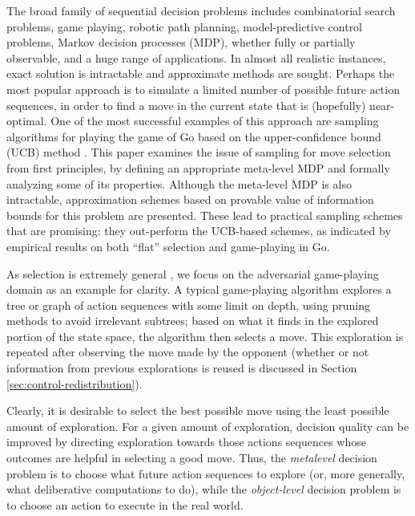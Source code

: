 The broad family of sequential decision problems includes
combinatorial search problems, game playing, robotic path planning,
model-predictive control problems, Markov decision processes (MDP), whether fully or
partially observable, and a huge range of applications. In almost all
realistic instances, exact solution is intractable and approximate
methods are sought. Perhaps the most popular approach is to simulate
a limited number of possible future action sequences, 
in order to find a move in the current state that is (hopefully)
near-optimal. One of the most successful
examples of this approach are sampling algorithms for
playing the game of Go \citep{Gelly.mogo} based on the upper-confidence bound (UCB)
method \citep{Kocsis+Szepesvari:2006}. This paper examines the issue of sampling for move selection from
first principles, by defining an appropriate meta-level MDP and formally
analyzing some of its properties. Although
the meta-level MDP is also intractable, approximation schemes based on
provable value of information bounds for this problem are presented. 
These lead to practical sampling schemes that
are promising: they out-perform the UCB-based schemes,
as indicated by empirical results on both ``flat'' selection and
game-playing in Go.

As selection is extremely general \citep{TolpinShimony:2012}, we focus on the adversarial
game-playing domain as an example for clarity.
A typical game-playing algorithm explores a tree or graph of action sequences
with some limit on depth, using pruning methods to avoid irrelevant
subtrees; based on what it finds in the explored portion of the state space, the algorithm
then selects a move. This exploration is repeated after observing the move
made by the opponent (whether or not information from previous explorations
is reused is discussed in Section \ref{sec:control-redistribution}).

Clearly, it is desirable to select the best possible move using the
least possible amount of exploration. For a given amount of
exploration, decision quality can be improved by directing exploration
towards those actions sequences whose outcomes are helpful in selecting
a good move. Thus, the {\em metalevel} decision problem is to choose
what future action sequences to explore (or, more generally, what
deliberative computations to do), while the {\em object-level}
decision problem is to choose an action to execute in the real world.

